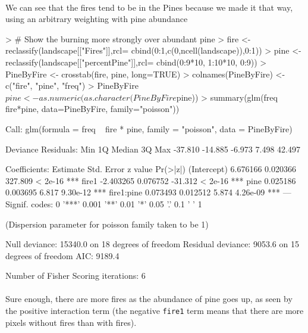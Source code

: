 \documentclass{article}
\begin{document}
\paragraph{}
We can see that the fires tend to be in the Pines because we made it that way, using an arbitrary weighting with pine abundance

\begin{Schunk}
\begin{Sinput}
> # Show the burning more strongly over abundant pine
> fire <- reclassify(landscape[["Fires"]],rcl= cbind(0:1,c(0,ncell(landscape)),0:1))
> pine <- reclassify(landscape[["percentPine"]],rcl= cbind(0:9*10, 1:10*10, 0:9))
> PineByFire <- crosstab(fire, pine, long=TRUE)
> colnames(PineByFire) <- c("fire", "pine", "freq")
> PineByFire$pine <- as.numeric(as.character(PineByFire$pine))
> summary(glm(freq ~ fire*pine, data=PineByFire, family="poisson"))
\end{Sinput}
\begin{Soutput}
Call:
glm(formula = freq ~ fire * pine, family = "poisson", data = PineByFire)

Deviance Residuals: 
    Min       1Q   Median       3Q      Max  
-37.810  -14.885   -6.973    7.498   42.497  

Coefficients:
             Estimate Std. Error z value Pr(>|z|)    
(Intercept)  6.676166   0.020366 327.809  < 2e-16 ***
fire1       -2.403265   0.076752 -31.312  < 2e-16 ***
pine         0.025186   0.003695   6.817 9.30e-12 ***
fire1:pine   0.073493   0.012512   5.874 4.26e-09 ***
---
Signif. codes:  0 '***' 0.001 '**' 0.01 '*' 0.05 '.' 0.1 ' ' 1

(Dispersion parameter for poisson family taken to be 1)

    Null deviance: 15340.0  on 18  degrees of freedom
Residual deviance:  9053.6  on 15  degrees of freedom
AIC: 9189.4

Number of Fisher Scoring iterations: 6
\end{Soutput}
\end{Schunk}

\paragraph{}
Sure enough, there are more fires as the abundance of pine goes up, as seen by the positive interaction term (the negative \texttt{fire1} term means that there are more pixels without fires than with fires).
\end{document}
